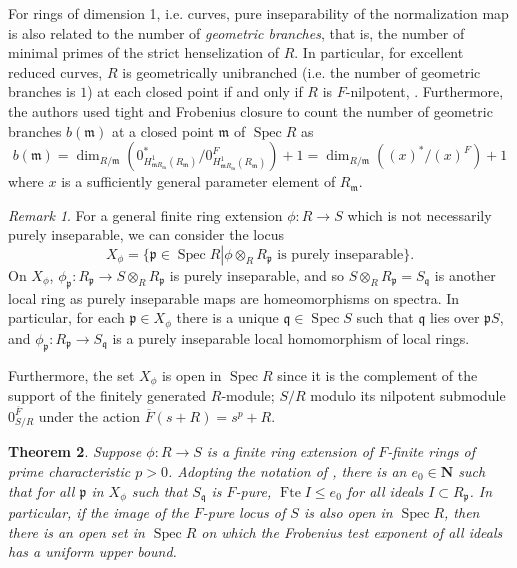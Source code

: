 \documentclass{amsproc}
\newtheorem{theorem}{Theorem}[section]
\theoremstyle{definition}
\theoremstyle{remark}
\newtheorem{remark}[theorem]{Remark}
\numberwithin{equation}{section}
\newcommand{\NN}{\mathbf{N}}
\newcommand{\fm}{\mathfrak{m}}
\newcommand{\fp}{\mathfrak{p}}
\newcommand{\fq}{\mathfrak{q}}
\newcommand{\Spec}{\operatorname{Spec}}
\newcommand{\fte}{\operatorname{Fte}}
\begin{document}
For rings of dimension 1, i.e. curves, pure inseparability of the normalization map is also related to the number of \textit{geometric branches}, that is, the number of minimal primes of the strict henselization of $R$. In particular, for excellent reduced curves, $R$ is geometrically unibranched (i.e. the number of geometric branches is $1$) at each closed point if and only if $R$ is $F$-nilpotent, \cite[Thm. 1.2]{DMP24}. Furthermore, the authors used tight and Frobenius closure to count the number of geometric branches $b(\fm)$ at a closed point $\fm$ of $\Spec R$ as \[
b(\fm) = \dim_{R / \fm} \left(0^*_{H^1_{\fm R_\fm}(R_\fm)}/0^F_{H^1_{\fm R_\fm}(R_\fm)}\right) + 1 = \dim_{R/\fm}\left((x)^*/(x)^F\right) + 1
\] where $x$ is a sufficiently general parameter element of $R_\fm$.

\begin{remark}\label{rmk: pi locus}
For a general finite ring extension $\phi: R\rightarrow S$ which is not necessarily purely inseparable, we can consider the locus \[X_\phi = \{ \fp \in \Spec R \left| \phi \otimes_R R_\fp \text{ is purely inseparable} \right.  \}.\] On $X_\phi$, $\phi_\fp: R_\fp \rightarrow S\otimes_R R_\fp$ is purely inseparable, and so $S\otimes_R R_\fp = S_\fq$ is another local ring as purely inseparable maps are homeomorphisms on spectra. In particular, for each $\fp \in X_\phi$ there is a unique $\fq \in \Spec S$ such that $\fq$ lies over $\fp S$, and $\phi_\fp :R_\fp \rightarrow S_\fq$ is a purely inseparable local homomorphism of local rings.

Furthermore, the set $X_\phi$ is open in $\Spec R$ since it is the complement of the support of the finitely generated $R$-module; $S/R$ modulo its nilpotent submodule $0^{\overline{F}}_{S/R}$ under the action $\overline{F}(s+R) = s^p+R$.

\end{remark}
\begin{theorem}\label{FTE:open}
Suppose $\phi \colon R\rightarrow S$ is a finite ring extension of $F$-finite rings of prime characteristic $p>0$. Adopting the notation of , there is an $e_0 \in \NN$ such that for all $\fp$ in $X_\phi$ such that $S_\fq$ is $F$-pure, $\fte I \le e_0$ for all ideals $I\subset R_\fp$. In particular, if the image of the $F$-pure locus of $S$ is also open in $\Spec R$, then there is an open set in $\Spec R$ on which the Frobenius test exponent of all ideals has a uniform upper bound.
\end{theorem}
\end{document}
